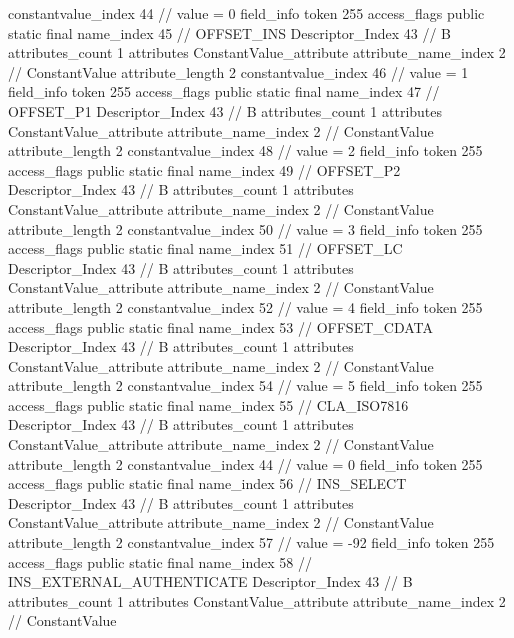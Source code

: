 {{{{{{{					constantvalue_index	44		// value = 0
				}
				}
			}
			field_info {
				token	255
				access_flags	public static final
				name_index	45		// OFFSET_INS
				Descriptor_Index	43		// B
				attributes_count	1
				attributes {
				ConstantValue_attribute {
					attribute_name_index	2		// ConstantValue
					attribute_length	2
					constantvalue_index	46		// value = 1
				}
				}
			}
			field_info {
				token	255
				access_flags	public static final
				name_index	47		// OFFSET_P1
				Descriptor_Index	43		// B
				attributes_count	1
				attributes {
				ConstantValue_attribute {
					attribute_name_index	2		// ConstantValue
					attribute_length	2
					constantvalue_index	48		// value = 2
				}
				}
			}
			field_info {
				token	255
				access_flags	public static final
				name_index	49		// OFFSET_P2
				Descriptor_Index	43		// B
				attributes_count	1
				attributes {
				ConstantValue_attribute {
					attribute_name_index	2		// ConstantValue
					attribute_length	2
					constantvalue_index	50		// value = 3
				}
				}
			}
			field_info {
				token	255
				access_flags	public static final
				name_index	51		// OFFSET_LC
				Descriptor_Index	43		// B
				attributes_count	1
				attributes {
				ConstantValue_attribute {
					attribute_name_index	2		// ConstantValue
					attribute_length	2
					constantvalue_index	52		// value = 4
				}
				}
			}
			field_info {
				token	255
				access_flags	public static final
				name_index	53		// OFFSET_CDATA
				Descriptor_Index	43		// B
				attributes_count	1
				attributes {
				ConstantValue_attribute {
					attribute_name_index	2		// ConstantValue
					attribute_length	2
					constantvalue_index	54		// value = 5
				}
				}
			}
			field_info {
				token	255
				access_flags	public static final
				name_index	55		// CLA_ISO7816
				Descriptor_Index	43		// B
				attributes_count	1
				attributes {
				ConstantValue_attribute {
					attribute_name_index	2		// ConstantValue
					attribute_length	2
					constantvalue_index	44		// value = 0
				}
				}
			}
			field_info {
				token	255
				access_flags	public static final
				name_index	56		// INS_SELECT
				Descriptor_Index	43		// B
				attributes_count	1
				attributes {
				ConstantValue_attribute {
					attribute_name_index	2		// ConstantValue
					attribute_length	2
					constantvalue_index	57		// value = -92
				}
				}
			}
			field_info {
				token	255
				access_flags	public static final
				name_index	58		// INS_EXTERNAL_AUTHENTICATE
				Descriptor_Index	43		// B
				attributes_count	1
				attributes {
				ConstantValue_attribute {
					attribute_name_index	2		// ConstantValue
}}}}}}}
